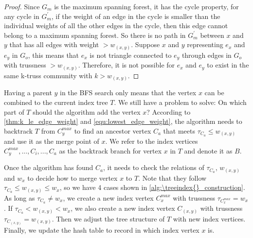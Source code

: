 \begin{proof}
Since $G_m$ is the maximum spanning forest, it has the cycle property, \ie for any cycle in $G_{m}^{\prime}$, if the weight of an edge in the cycle is smaller than the individual weights of all the other edges in the cycle, then this edge cannot belong to a maximum spanning forest. So there is no path in $G_{m}^{\prime}$ between $x$ and $y$ that has all edges with weight $> w_{(x,y)}$. Suppose $x$ and $y$ representing $e_x$ and $e_y$ in $G_o$, this means that $e_x$ is not triangle connected to $e_y$ through edges in $G_o$ with trussness $> w_{(x,y)}$. Therefore, it is not possible for $e_x$ and $e_y$ to exist in the same k-truss community with $k > w_{(x,y)}$.
\end{proof}
 
Having a parent $y$ in the BFS search only means that the vertex $x$ can be combined to the current index tree $T$. We still have a problem to solve: On which part of $T$ should the algorithm add the vertex $x$? According to \autoref{thm:k_le_edge_weight} and \autoref{equ:lowest_edge_weight}, the algorithm needs to backtrack $T$ from $C_{y}^{max}$ to find an ancestor vertex $C_a$ that meets $\tau_{C_a} \le w_{(x,y)}$ and use it as the merge point of $x$. We refer to the index vertices $C_{y}^{max},...,C_{i},...,C_{a}$ as the backtrack branch for vertex $x$ in $T$ and denote it as $B$. %

Once the algorithm has found $C_a$, it needs to check the relations of $\tau_{C_a}$, $w_{(x,y)}$ and $w_{x}$ to decide how to merge vertex $x$ to $T$. Note that they follow $\tau_{C_a} \le w_{(x,y)} \le w_{x}$, so we have 4 cases shown in \autoref{alg:\treeindex{}_construction}. As long as $\tau_{C_a} \neq w_{x}$, we create a new index vertex $C_{x}^{max}$ with trussness $\tau_{C_{x}^{max}} = w_{x}$. If $\tau_{C_a} < w_{(x,y)} < w_{x}$, we also create a new index vertex $C_{(x,y)}$ with trussness $\tau_{C_{(x,y)}} = w_{(x,y)}$. Then we adjust the tree structure of $T$ with new index vertices. Finally, we update the hash table to record in which index vertex $x$ is.

